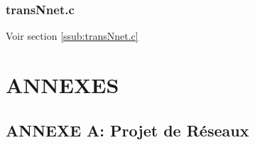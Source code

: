 \documentclass[11pt,french]{article}
\begin{document}
            \subsubsection{transNnet.c} %
            \label{ssub:transNnet.c-net}
                Voir section {\color{blue} \ref{ssub:transNnet.c}}
    \newpage
    \section{ANNEXES} %
    \label{sec:ANNEXES}
        \subsection*{ANNEXE A: Projet de Réseaux} %
        \label{sub:ANNEXE A: Projet de Réseaux}
        
        
\end{document}
